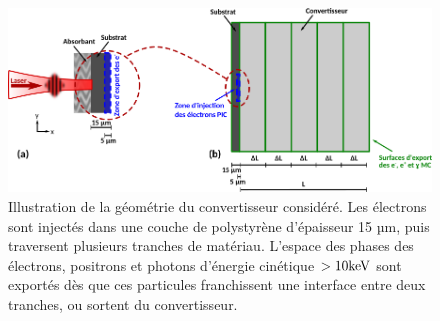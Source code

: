 \begin{refsection}
\begin{figure}[hbtp]
	\centering
	\includegraphics[width=\linewidth]{6-opti_numerique/definition_convertisseur.png}
	\caption{Illustration de la géométrie du convertisseur considéré. Les électrons sont injectés dans une couche de polystyrène d'épaisseur 15 µm, puis traversent plusieurs tranches de matériau. L'espace des phases des électrons, positrons et photons d'énergie cinétique $> 10 \rm keV$ sont exportés dès que ces particules franchissent une interface entre deux tranches, ou sortent du convertisseur.}
	\label{fig:63-principe_MC}
\end{figure}



\end{refsection}
